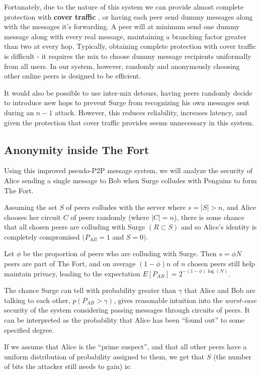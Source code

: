 \documentclass[twocolumn,11pt,english]{article}
\begin{document}
Fortunately, due to the nature of this system we can provide almost complete protection with \textbf{cover traffic} \cite{trickle02}, or having each peer send dummy messages along with the messages it's forwarding. A peer will at minimum send one dummy message along with every real message, maintaining a branching factor greater than two at every hop. Typically, obtaining complete protection with cover traffic is difficult - it requires the mix to choose dummy message recipients uniformally from all users\cite{trickle02}. In our system, however, randomly and anonymously choosing other online peers is designed to be efficient.

It would also be possible to use inter-mix detours\cite{trickle02}, having peers randomly decide to introduce new hops to prevent Surge from recognizing his own messages sent during an $n - 1$ attack. However, this reduces reliability, increases latency, and given the protection that cover traffic provides seems unnecessary in this system. 

\subsection{Anonymity inside The Fort} 
Using this improved pseudo-P2P message system, we will analyze the security of Alice sending a single message to Bob when Surge colludes with Penguins to form The Fort. 

Assuming the set $S$ of peers colludes with the server where $s = |S| > n$, and Alice chooses her circuit $C$ of peers randomly (where $|C| = n$), there is some chance that all chosen peers are colluding with Surge $(R \subset S)$ and so Alice's identity is completely compromised $(P_{AB} = 1$ and $S = 0)$. 

Let $\phi$ be the proportion of peers who are colluding with Surge. Then $s = \phi N$ peers are part of The Fort, and on average $(1 - \phi)n$ of $n$ chosen peers still help maintain privacy, leading to the expectation $E[P_{AB}] = 2^{-(1 - \phi) \log(N)}$. 

The chance Surge can tell with probability greater than $\gamma$ that Alice and Bob are talking to each other, $p(P_{AB} > \gamma)$, gives reasonable intuition into the \textit{worst-case} security of the system considering passing messages through circuits of peers. It can be interpreted as the probability that Alice has been ``found out'' to some specified degree. 

If we assume that Alice is the ``prime suspect'', and that all other peers have a uniform distribution of probability assigned to them, we get that $S$ (the number of bits the attacker still needs to gain) is:
\end{document}
